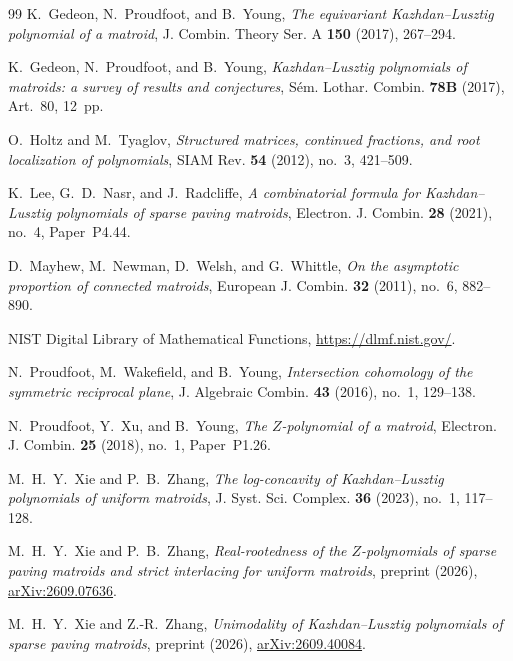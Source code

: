 \documentclass[11pt]{article}
\numberwithin{equation}{section}
\theoremstyle{remark}\newtheorem{remark}[theorem]{Remark}
\begin{document}
\begin{thebibliography}{99}
K.~Gedeon, N.~Proudfoot, and B.~Young,
\emph{The equivariant Kazhdan--Lusztig polynomial of a matroid},
J. Combin. Theory Ser. A \textbf{150} (2017), 267--294.

K.~Gedeon, N.~Proudfoot, and B.~Young,
\emph{Kazhdan--Lusztig polynomials of matroids:
a survey of results and conjectures},
S\'em. Lothar. Combin. \textbf{78B} (2017), Art.~80, 12~pp.

O.~Holtz and M.~Tyaglov,
\emph{Structured matrices, continued fractions, and root localization of polynomials},
SIAM Rev. \textbf{54} (2012), no.~3, 421--509.

K.~Lee, G.~D.~Nasr, and J.~Radcliffe,
\emph{A combinatorial formula for Kazhdan--Lusztig polynomials of
sparse paving matroids},
Electron. J. Combin. \textbf{28} (2021), no.~4, Paper~P4.44.

D.~Mayhew, M.~Newman, D.~Welsh, and G.~Whittle,
\emph{On the asymptotic proportion of connected matroids},
European J. Combin. \textbf{32} (2011), no.~6, 882--890.

NIST Digital Library of Mathematical Functions,
\url{https://dlmf.nist.gov/}.

N.~Proudfoot, M.~Wakefield, and B.~Young,
\emph{Intersection cohomology of the symmetric reciprocal plane},
J. Algebraic Combin. \textbf{43} (2016), no.~1, 129--138.

N.~Proudfoot, Y.~Xu, and B.~Young,
\emph{The $Z$-polynomial of a matroid},
Electron. J. Combin. \textbf{25} (2018), no.~1, Paper~P1.26.

M.~H.~Y.~Xie and P.~B.~Zhang,
\emph{The log-concavity of Kazhdan--Lusztig polynomials of uniform matroids},
J. Syst. Sci. Complex. \textbf{36} (2023), no.~1, 117--128.

M.~H.~Y.~Xie and P.~B.~Zhang,
\emph{Real-rootedness of the $Z$-polynomials of sparse paving matroids
and strict interlacing for uniform matroids},
preprint (2026),
\href{https://arxiv.org/abs/2609.07636}{arXiv:2609.07636}.

M.~H.~Y.~Xie and Z.-R.~Zhang,
\emph{Unimodality of Kazhdan--Lusztig polynomials of sparse paving matroids},
preprint (2026),
\href{https://arxiv.org/abs/2609.40084}{arXiv:2609.40084}.

\end{thebibliography}
\end{document}
